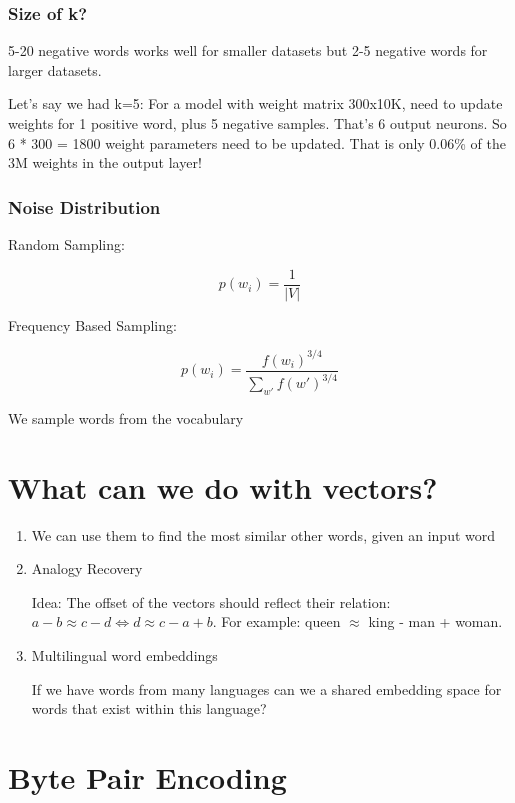 \documentclass[11pt]{article}
\begin{document}
\subsubsection{Size of k?}

5-20 negative words works well for smaller datasets but 2-5 negative words for larger datasets.

Let's say we had k=5: For a model with weight matrix 300x10K, need to update weights for 1 positive word, plus 5 negative samples. That's 6 output neurons. So 6 * 300 = 1800 weight parameters need to be updated. That is only 0.06\% of the 3M weights in the output layer!

\subsubsection{Noise Distribution}

Random Sampling:

\begin{equation*}
    p(w_i) = \frac 1 {|V|}
\end{equation*}

Frequency Based Sampling:

\begin{equation*}
    p(w_i) = \frac{f(w_i)^{3/4}}{\sum_{w'}f(w')^{3/4}}
\end{equation*}

We sample words from the vocabulary

\section{What can we do with vectors?}

\begin{enumerate}
    \item We can use them to find the most similar other words, given an input word
    \item Analogy Recovery

    Idea: The offset of the vectors should reflect their relation: $a-b \approx c -d \iff d \approx c - a + b$. For example: queen $\approx$ king - man + woman.

    \item Multilingual word embeddings
    
    If we have words from many languages can we a shared embedding space for words that exist within this language?
\end{enumerate}

\section{Byte Pair Encoding}
\end{document}
